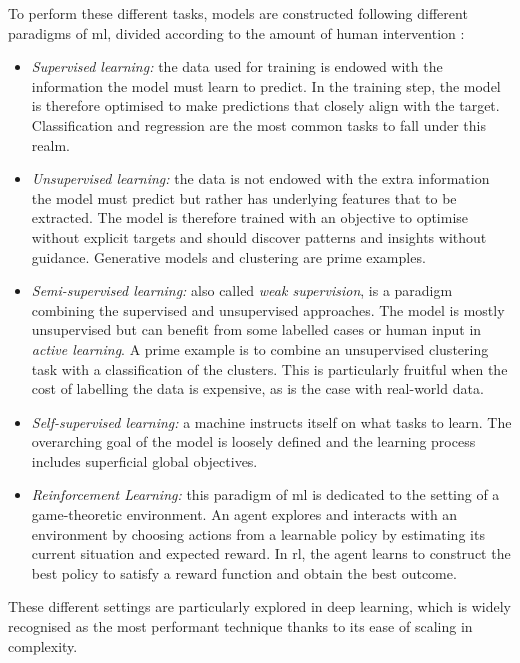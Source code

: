To perform these different tasks, models are constructed following different paradigms of \gls{ml}, divided according to the amount of human intervention \cite{MurphyML}:
\begin{itemize}
    \item \textit{Supervised learning:} the data used for training is endowed with the information the model must learn to predict. In the training step, the model is therefore optimised to make predictions that closely align with the target. Classification and regression are the most common tasks to fall under this realm.
    \item \textit{Unsupervised learning:} the data is not endowed with the extra information the model must predict but rather has underlying features that to be extracted. The model is therefore trained with an objective to optimise without explicit targets and should discover patterns and insights without guidance. Generative models and clustering are prime examples. 
    \item \textit{Semi-supervised learning:} also called \textit{weak supervision}, is a paradigm combining the supervised and unsupervised approaches. The model is mostly unsupervised but can benefit from some labelled cases or human input in \textit{active learning}. A prime example is to combine an unsupervised clustering task with a classification of the clusters. This is particularly fruitful when the cost of labelling the data is expensive, as is the case with real-world data.
    \item \textit{Self-supervised learning:} a machine instructs itself on what tasks to learn. The overarching goal of the model is loosely defined and the learning process includes superficial global objectives.
    \item \textit{Reinforcement Learning:} this paradigm of \gls{ml} is dedicated to the setting of a game-theoretic environment. An agent explores and interacts with an environment by choosing actions from a learnable policy by estimating its current situation and expected reward. In \gls{rl}, the agent learns to construct the best policy to satisfy a reward function and obtain the best outcome.
\end{itemize}
These different settings are particularly explored in deep learning, which is widely recognised as the most performant technique thanks to its ease of scaling in complexity.

